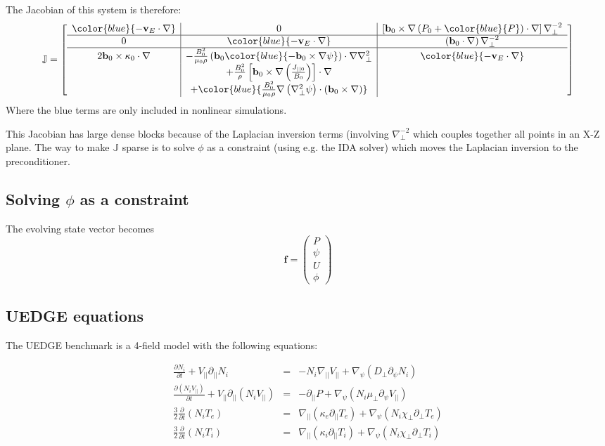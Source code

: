 \documentclass[12pt]{article}
\newcommand{\deriv}[2]{\ensuremath{\frac{\partial #1}{\partial #2}}}
\newcommand{\Vpar}{\ensuremath{V_{||}}}
\newcommand{\Vec}[1]{\ensuremath{\mathbf{#1}}}
\newcommand{\bvec}{\Vec{b}}
\newcommand{\kvec}{\Vec{\kappa}}
\newcommand{\vvec}{\Vec{v}}
\newcommand{\bxk}{\bvec_0\times\kvec_0\cdot\nabla}
\newcommand{\delp}{\nabla_\perp^2}
\newcommand{\Jac}{\ensuremath{\mathbb{J}}}
\begin{document}
The Jacobian of this system is therefore:
\begin{equation}
\mathbb{J} = 
\left[ \begin{array}{c|c|c}
\color{blue}{-\vvec_E\cdot\nabla} & 0 & \left[\bvec_0\times\nabla\left(P_0 + \color{blue}{P}\right)\cdot\nabla\right]\nabla_\perp^{-2} \\
\hline
0 & \color{blue}{-\vvec_E\cdot\nabla} & \left(\bvec_0\cdot\nabla\right)\nabla_\perp^{-2}  \\
\hline
2\bxk  & -\frac{B_0^2}{\mu_0\rho}\left(\bvec_0 \color{blue}{-\bvec_0\times\nabla\psi}\right)\cdot\nabla\delp  & \color{blue}{-\vvec_E\cdot\nabla} \\
 & + \frac{B_0^2}{\rho}\left[\bvec_0\times\nabla\left(\frac{J_{||0}}{B_0}\right)\right]\cdot\nabla & \\
 & + \color{blue}{\frac{B_0^2}{\mu_0\rho}\nabla\left(\delp\psi\right)\cdot\left(\bvec_0\times\nabla\right)} & 
\end{array}\right]
\label{eq:mhdjacobian}
\end{equation}
Where the blue terms are only included in nonlinear simulations.

This Jacobian has large dense blocks because of the Laplacian inversion terms
(involving $\nabla_\perp^{-2}$ which couples together all points in an
X-Z plane. The way to make $\Jac$ sparse is to solve $\phi$ as a constraint
(using e.g. the IDA solver) which moves the Laplacian inversion to the
preconditioner.

\subsection{Solving $\phi$ as a constraint}

The evolving state vector becomes
\[
\Vec{f} = \left(\begin{array}{c}
P \\
\psi \\
U \\
\phi
\end{array}\right)
\]

\subsection{UEDGE equations}

The UEDGE benchmark is a 4-field model with the following equations:

\begin{eqnarray*}
\deriv{N_i}{t} + \Vpar\partial_{||}N_i &=& -N_i\nabla_{||}\Vpar +\nabla_\psi\left(D_\perp \partial_\psi N_i\right) \\
\deriv{\left(N_i\Vpar\right)}{t} + \Vpar\partial_{||}\left(N_i\Vpar\right) &=& -\partial_{||}P + \nabla_\psi\left(N_i\mu_\perp\partial_\psi\Vpar\right) \\
\frac{3}{2}\deriv{}{t}\left(N_iT_e\right) &=& \nabla_{||}\left(\kappa_e\partial_{||}T_e\right) + \nabla_\psi\left(N_i\chi_\perp\partial_\perp T_e\right) \\
\frac{3}{2}\deriv{}{t}\left(N_iT_i\right) &=& \nabla_{||}\left(\kappa_i\partial_{||}T_i\right) + \nabla_\psi\left(N_i\chi_\perp\partial_\perp T_i\right)
\end{eqnarray*}
\end{document}
